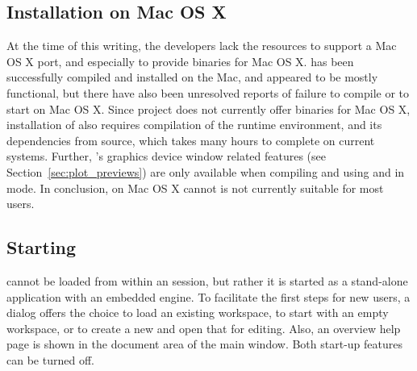 \subsection{Installation on Mac OS X}
At the time of this writing, the developers lack the resources to support a Mac OS X port, and especially
to provide binaries for Mac OS X.  has been successfully compiled and installed on the Mac, and
appeared to be mostly functional, but there have also been unresolved reports of failure to compile or to start
 on Mac OS X. Since  project does not currently offer binaries for Mac OS X, installation
of  also requires compilation of the  runtime environment, and its dependencies from source,
which takes many hours to complete on current systems. Further, 's graphics device window related features
(see Section~\ref{sec:plot_previews}) are only available when compiling and using  and  in
 mode. In conclusion,  on Mac OS X cannot is not currently suitable for most users.

\subsection[Starting RKWard]{Starting }
 cannot be loaded from within an 
session, but rather it is started as a stand-alone application with an
embedded  engine. To facilitate the first
steps for new users, a dialog offers the choice to load an existing
workspace, to start with an empty workspace, or to create a new
 and open that for editing. Also, an overview help page is
shown in the document area of the main window. Both start-up features
can be turned off.
